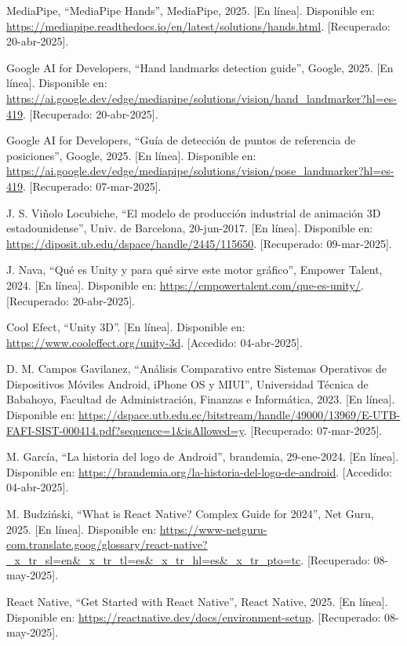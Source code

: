 \begin{thebibliography}{200}
    MediaPipe, “MediaPipe Hands”, MediaPipe, 2025. [En línea]. Disponible en: \url{https://mediapipe.readthedocs.io/en/latest/solutions/hands.html}. [Recuperado: 20-abr-2025].

    Google AI for Developers, “Hand landmarks detection guide”, Google, 2025. [En línea]. Disponible en: \url{https://ai.google.dev/edge/mediapipe/solutions/vision/hand_landmarker?hl=es-419}. [Recuperado: 20-abr-2025].

    Google AI for Developers, “Guía de detección de puntos de referencia de posiciones”, Google, 2025. [En línea]. Disponible en: \url{https://ai.google.dev/edge/mediapipe/solutions/vision/pose_landmarker?hl=es-419}. [Recuperado: 07-mar-2025].

    J. S. Viñolo Locubiche, “El modelo de producción industrial de animación 3D estadounidense”, Univ. de Barcelona, 20-jun-2017. [En línea]. Disponible en: \url{https://diposit.ub.edu/dspace/handle/2445/115650}. [Recuperado: 09-mar-2025].

    J. Nava, “Qué es Unity y para qué sirve este motor gráfico”, Empower Talent, 2024. [En línea]. Disponible en: \url{https://empowertalent.com/que-es-unity/}. [Recuperado: 20-abr-2025].

    Cool Efect, “Unity 3D”. [En línea]. Disponible en: \url{https://www.cooleffect.org/unity-3d}. [Accedido: 04-abr-2025].

    D. M. Campos Gavilanez, “Análisis Comparativo entre Sistemas Operativos de Dispositivos Móviles Android, iPhone OS y MIUI”, Universidad Técnica de Babahoyo, Facultad de Administración, Finanzas e Informática, 2023. [En línea]. Disponible en: \url{https://dspace.utb.edu.ec/bitstream/handle/49000/13969/E-UTB-FAFI-SIST-000414.pdf?sequence=1&isAllowed=y}. [Recuperado: 07-mar-2025].

    M. García, “La historia del logo de Android”, brandemia, 29-ene-2024. [En línea]. Disponible en: \url{https://brandemia.org/la-historia-del-logo-de-android}. [Accedido: 04-abr-2025].

    M. Budziński, “What is React Native? Complex Guide for 2024”, Net Guru, 2025. [En línea]. Disponible en: \url{https://www-netguru-com.translate.goog/glossary/react-native?_x_tr_sl=en&_x_tr_tl=es&_x_tr_hl=es&_x_tr_pto=tc}. [Recuperado: 08-may-2025].

    React Native, “Get Started with React Native”, React Native, 2025. [En línea]. Disponible en: \url{https://reactnative.dev/docs/environment-setup}. [Recuperado: 08-may-2025].


\end{thebibliography}
